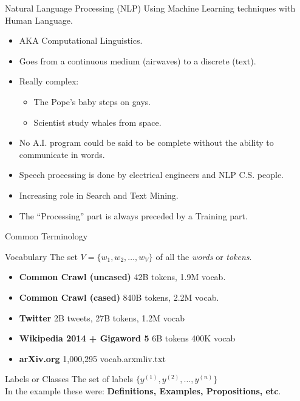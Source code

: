 \documentclass{beamer}
\begin{document}
\begin{frame}{Natural Language Processing (NLP)}
    Using Machine Learning techniques with Human Language.
    \begin{itemize}
            \item AKA Computational Linguistics.
            \item Goes from a continuous medium (airwaves) to a discrete (text).
            \item Really complex:
    \begin{itemize}
            \item The Pope's baby steps on gays.
            \item Scientist study whales from space.
    \end{itemize}
    \item No A.I. program could be said to be complete without the ability to communicate in words.
        \item Speech processing is done by electrical engineers and NLP C.S. people.
        \item Increasing role in Search and Text Mining.
            \item The ``Processing'' part is always preceded by a Training part.
    \end{itemize}
     
\end{frame}

\begin{frame}{Common Terminology}
    \begin{exampleblock}{Vocabulary}
        The set $V = \{w_1,w_2,\ldots, w_V\}$ of all the \textit{words} or \textit{tokens}.
    \end{exampleblock}
        \begin{itemize}
            \item \textbf{Common Crawl (uncased)} 42B tokens, 1.9M vocab.
            \item \textbf{Common Crawl (cased)} 840B tokens, 2.2M vocab.
            \item \textbf{Twitter} 2B tweets, 27B tokens, 1.2M vocab
            \item \textbf{Wikipedia 2014 + Gigaword 5} 6B tokens 400K vocab
            \item \textbf{arXiv.org} 1,000,295 vocab.arxmliv.txt
        \end{itemize}

        \begin{exampleblock}{Labels or Classes}
            The set of labels $\{y^{(1)},y^{(2)},\ldots, y^{(n)}\}$\\
            In the example these were: \textbf{Definitions, Examples, Propositions, etc}.
        \end{exampleblock}


\end{frame}
\end{document}
